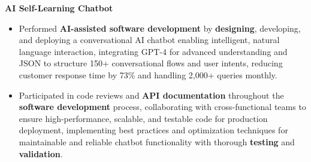 \documentclass[a4paper,10pt]{article}
\begin{document}
\vspace{-2mm}
\textbf{AI Self-Learning Chatbot} \\
\begin{itemize}[leftmargin=*, itemsep=0pt, parsep=1pt]
\vspace{-7mm}
    \item Performed \textbf{AI-assisted software development} by \textbf{designing}, developing, and deploying a conversational AI chatbot enabling intelligent, natural language interaction, integrating GPT-4 for advanced understanding and JSON to structure 150+ conversational flows and user intents, reducing customer response time by 73\% and handling 2,000+ queries monthly.
    \item Participated in code reviews and \textbf{API documentation} throughout the \textbf{software development} process, collaborating with cross-functional teams to ensure high-performance, scalable, and testable code for production deployment, implementing best practices and optimization techniques for maintainable and reliable chatbot functionality with thorough \textbf{testing} and \textbf{validation}.
\end{itemize}

\vspace{-2mm}
\end{document}
